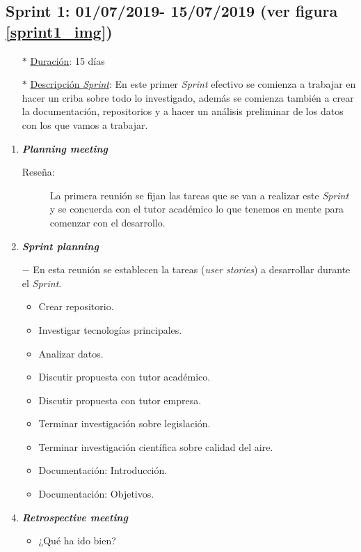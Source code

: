 \subsection{Sprint 1: 01/07/2019- 15/07/2019 (ver figura \ref{sprint1_img})}\label{sprint1}
\begin{itemize}
\item[$\ast$] \underline{Duración}:  15 días
\item[$\ast$] \underline{Descripción \textit{Sprint}}: En este primer \textit{Sprint} efectivo se comienza a trabajar en hacer un criba sobre todo lo investigado, además se comienza también a crear la documentación, repositorios y a hacer un análisis preliminar de los datos con los que vamos a trabajar.
\end{itemize}
\begin{enumerate}
	\item \textbf{\textit{Planning meeting}}
	\begin{description}
		\item[Reseña:] La primera reunión se fijan las tareas que se van a realizar este \textit{Sprint} y se concuerda con el tutor académico lo que tenemos en mente para comenzar con el desarrollo.
	\end{description}
	\item \textbf{\textit{Sprint planning}}
	\item[$-$] En esta reunión se establecen la tareas (\textit{user stories}) a desarrollar durante el \textit{Sprint}. 
	\begin{itemize}
		\item Crear repositorio.
		\item Investigar tecnologías principales.
		\item Analizar datos.
		\item Discutir propuesta con tutor académico.
		\item Discutir propuesta con tutor empresa.
		\item Terminar investigación sobre legislación.
		\item Terminar investigación científica sobre calidad del aire.
		\item Documentación: Introducción.
		\item Documentación: Objetivos.
	\end{itemize}
	\item \textbf{\textit{Retrospective meeting}}
	\begin{itemize}
		\item ¿Qué ha ido bien?
		\begin{itemize}

\end{itemize}
\end{itemize}
\end{enumerate}
